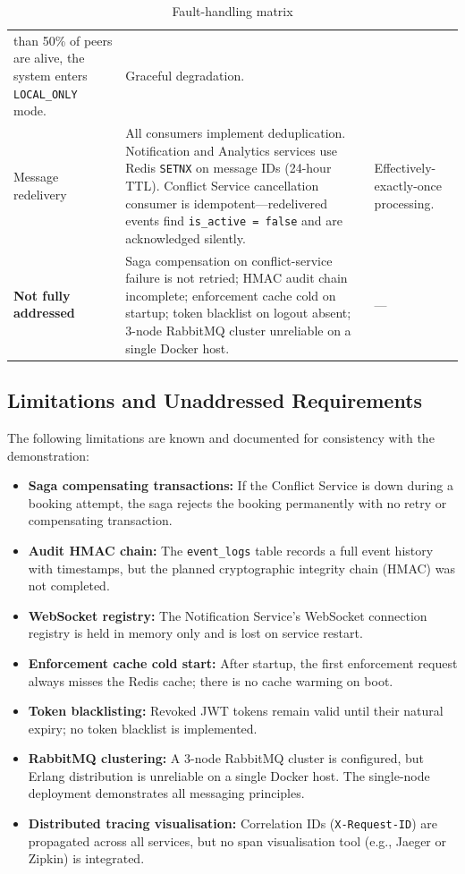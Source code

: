 \documentclass[12pt,a4paper]{article}
\begin{document}
\begin{table}[H]
\begin{tabularx}{\textwidth}{L{3.4cm} X X}
    than 50\% of peers are alive, the system enters \texttt{LOCAL\_ONLY} mode. & Graceful degradation. \\\addlinespace[0.1cm]
  Message redelivery &
    All consumers implement deduplication. Notification and Analytics services use Redis \texttt{SETNX} on message IDs (24-hour TTL). Conflict Service cancellation consumer is idempotent---redelivered events find \texttt{is\_active = false} and are acknowledged silently. & Effectively-exactly-once processing. \\\addlinespace[0.1cm]
  \textbf{Not fully addressed} &
    Saga compensation on conflict-service failure is not retried;
    HMAC audit chain incomplete; enforcement cache cold on startup;
    token blacklist on logout absent; 3-node RabbitMQ cluster unreliable
    on a single Docker host. & --- \\
  \bottomrule
\end{tabularx}
\caption{Fault-handling matrix}
\label{tab:faults}
\end{table}

\subsection{Limitations and Unaddressed Requirements}
 
The following limitations are known and documented for consistency with the demonstration:
 
\begin{itemize}
    \item \textbf{Saga compensating transactions:} If the Conflict Service is down during a booking attempt, the saga rejects the booking permanently with no retry or compensating transaction.
    \item \textbf{Audit HMAC chain:} The \texttt{event\_logs} table records a full event history with timestamps, but the planned cryptographic integrity chain (HMAC) was not completed.
    \item \textbf{WebSocket registry:} The Notification Service's WebSocket connection registry is held in memory only and is lost on service restart.
    \item \textbf{Enforcement cache cold start:} After startup, the first enforcement request always misses the Redis cache; there is no cache warming on boot.
    \item \textbf{Token blacklisting:} Revoked JWT tokens remain valid until their natural expiry; no token blacklist is implemented.
    \item \textbf{RabbitMQ clustering:} A 3-node RabbitMQ cluster is configured, but Erlang distribution is unreliable on a single Docker host. The single-node deployment demonstrates all messaging principles.
    \item \textbf{Distributed tracing visualisation:} Correlation IDs (\texttt{X-Request-ID}) are propagated across all services, but no span visualisation tool (e.g., Jaeger or Zipkin) is integrated.
\end{itemize}
\end{document}
